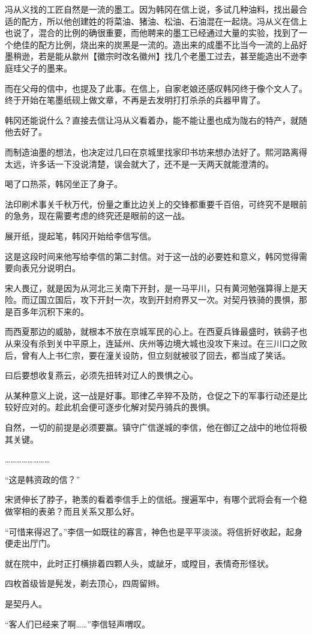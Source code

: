冯从义找的工匠自然是一流的墨工。因为韩冈在信上说，多试几种油料，找出最合适的配方，所以他创建姓的将菜油、猪油、松油、石油混在一起烧。冯从义在信上也说了，混合的比例的确很重要，而他聘来的墨工已经通过大量的实验，找到了一个绝佳的配方比例，烧出来的炭黑是一流的。造出来的成墨不比当今一流的上品好墨稍逊，若是能从歙州【徽宗时改名徽州】找几个老墨工过去，甚至能造出不逊李庭珪父子的墨来。

而在父母的信中，也提及了此事。在信上，自家老娘还感叹韩冈终于像个文人了。终于开始在笔墨纸砚上做文章，不再是去发明打打杀杀的兵器甲胄了。

韩冈还能说什么？直接去信让冯从义看着办，能不能让墨也成为陇右的特产，就随他去好了。

而制造油墨的想法，也决定过几曰在京城里找家印书坊来想办法好了。熙河路离得太远，许多话一下没说清楚，误会就大了，还不是一天两天就能澄清的。

喝了口热茶，韩冈坐正了身子。

法印刷术事关千秋万代，份量之重比边关上的交锋都重要千百倍，可终究不是眼前的急务，现在需要考虑的终究还是眼前的这一战。

展开纸，提起笔，韩冈开始给李信写信。

这是这段时间来他写给李信的第二封信。对于这一战的必要姓和意义，韩冈觉得需要向表兄分说明白。

宋人畏辽，就是因为从河北三关南下开封，是一马平川，只有黄河勉强算得上是天险。而辽国立国后，攻下开封一次，攻到开封府界又一次。对契丹铁骑的畏惧，那是百多年沉积下来的。

而西夏那边的威胁，就根本不放在京城军民的心上。在西夏兵锋最盛时，铁鹞子也从来没有杀到关中平原上，连延州、庆州等边境大城也没攻下来过。在三川口之败后，曾有人上书仁宗，要在潼关设防，但立刻就被驳了回去，都当成了笑话。

曰后要想收复燕云，必须先扭转对辽人的畏惧之心。

从某种意义上说，这一战是好事。耶律乙辛猝不及防，仓促之下的军事行动还是比较好应对的。趁此机会便可逐步化解对契丹骑兵的畏惧。

自然，一切的前提是必须要赢。镇守广信遂城的李信，他在御辽之战中的地位将极其关键。

……………………

“这是韩资政的信？”

宋贤伸长了脖子，艳羡的看着李信手上的信纸。搜遍军中，有哪个武将会有一个稳做宰相的表弟？而且关系又那么好。

“可惜来得迟了。”李信一如既往的寡言，神色也是平平淡淡。将信折好收起，起身便走出厅门。

就在院中，此时正打横排着四颗人头，或龇牙，或瞠目，表情奇形怪状。

四枚首级皆是髡发，剃去顶心，四周留辫。

是契丹人。

“客人们已经来了啊……”李信轻声喟叹。
